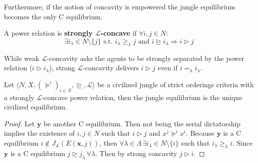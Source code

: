 
Furthermore, if the notion of concavity is empowered the jungle equilibrium becomes the only C equilibrium.

\begin{definition}
    A power relation is \textbf{strongly $\mathcal{L}$-concave} if $\forall i,j\in N$:
    \[\exists i_{\lambda}\in N\setminus\{j\}\text{ s.t. }i_{\lambda}\geq_{\lambda}j\text{ and }i\trianglerighteq i_{\lambda}\Rightarrow i\triangleright j\]
\end{definition}

While weak $\mathcal{L}$-concavity asks the agents to be strongly separated by the power relation ($i\triangleright i_{\lambda}$), strong $\mathcal{L}$-concavity delivers $i\triangleright j$ even if $i=_{\lambda} i_{\lambda}$.

\begin{proposition}\label{Prop: undivisible, strictly concave L}
    Let $\langle N,X,(\succeq^i)_{i\in N}, \trianglerighteq, \mathcal{L}\rangle$ be a civilized jungle of strict orderings criteria with a strongly $\mathcal{L}$-concave power relation, then the jungle equilibrium is the unique civilized equilibrium.

    \begin{proof}
        Let $\textbf{y}$ be another C equilibrium. Then not being the serial dictatorship implies the existence of $i,j\in N$ such that $i\triangleright j$ and $x^j\succeq^ix^i$. Because $\textbf{y}$ is a C equilibrium $i\notin J_{\mathcal{L}}(E(\textbf{x},j))$, then $\forall\lambda\in\Lambda\,\exists i_{\lambda}\in N\setminus\{i\}$ such that $i_{\lambda}\geq_{\lambda}i$. Since $\textbf{y}$ is a C equilibrium $j\trianglerighteq j_{\lambda}\,\forall\lambda$. Then by strong concavity $j\triangleright i$.  
    \end{proof}
\end{proposition}

\newpage


